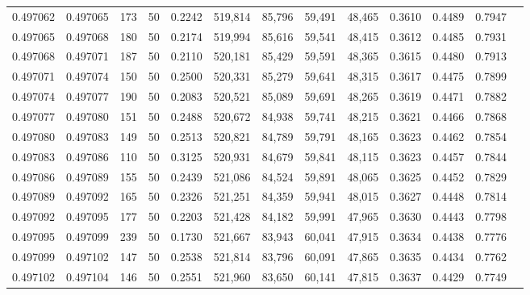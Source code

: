 \begin{tabular}{rrrrrrrrrrrrr}
0.497062 & 0.497065 &   173 &  50 &                                     0.2242 & 519,814 &  85,796 &  59,491 &  48,465 & 0.3610 & 0.4489 & 0.7947 \\
0.497065 & 0.497068 &   180 &  50 &                                     0.2174 & 519,994 &  85,616 &  59,541 &  48,415 & 0.3612 & 0.4485 & 0.7931 \\
0.497068 & 0.497071 &   187 &  50 &                                     0.2110 & 520,181 &  85,429 &  59,591 &  48,365 & 0.3615 & 0.4480 & 0.7913 \\
0.497071 & 0.497074 &   150 &  50 &                                     0.2500 & 520,331 &  85,279 &  59,641 &  48,315 & 0.3617 & 0.4475 & 0.7899 \\
0.497074 & 0.497077 &   190 &  50 &                                     0.2083 & 520,521 &  85,089 &  59,691 &  48,265 & 0.3619 & 0.4471 & 0.7882 \\
0.497077 & 0.497080 &   151 &  50 &                                     0.2488 & 520,672 &  84,938 &  59,741 &  48,215 & 0.3621 & 0.4466 & 0.7868 \\
0.497080 & 0.497083 &   149 &  50 &                                     0.2513 & 520,821 &  84,789 &  59,791 &  48,165 & 0.3623 & 0.4462 & 0.7854 \\
0.497083 & 0.497086 &   110 &  50 &                                     0.3125 & 520,931 &  84,679 &  59,841 &  48,115 & 0.3623 & 0.4457 & 0.7844 \\
0.497086 & 0.497089 &   155 &  50 &                                     0.2439 & 521,086 &  84,524 &  59,891 &  48,065 & 0.3625 & 0.4452 & 0.7829 \\
0.497089 & 0.497092 &   165 &  50 &                                     0.2326 & 521,251 &  84,359 &  59,941 &  48,015 & 0.3627 & 0.4448 & 0.7814 \\
0.497092 & 0.497095 &   177 &  50 &                                     0.2203 & 521,428 &  84,182 &  59,991 &  47,965 & 0.3630 & 0.4443 & 0.7798 \\
0.497095 & 0.497099 &   239 &  50 &                                     0.1730 & 521,667 &  83,943 &  60,041 &  47,915 & 0.3634 & 0.4438 & 0.7776 \\
0.497099 & 0.497102 &   147 &  50 &                                     0.2538 & 521,814 &  83,796 &  60,091 &  47,865 & 0.3635 & 0.4434 & 0.7762 \\
0.497102 & 0.497104 &   146 &  50 &                                     0.2551 & 521,960 &  83,650 &  60,141 &  47,815 & 0.3637 & 0.4429 & 0.7749 \\

\end{tabular}
